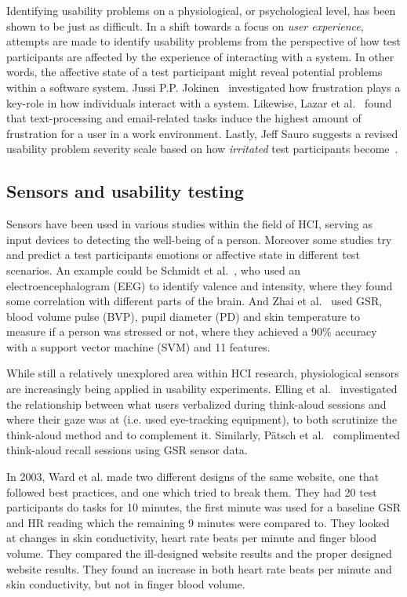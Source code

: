 Identifying usability problems on a physiological, or psychological level, has been shown to be just as difficult. In a
shift towards a focus on \textit{user experience}, attempts are made to identify usability problems
from the perspective of how test participants are affected by the experience of interacting with a system. In other
words, the affective state of a test participant might reveal potential problems within a software system. Jussi
P.P. Jokinen~\cite{workplace_up_study} investigated how frustration plays a key-role in how individuals interact with a
system. Likewise, Lazar et al.~\cite{frustration_with_computers} found that text-processing and email-related tasks
induce the highest amount of frustration for a user in a work environment. Lastly, Jeff Sauro suggests a revised usability problem severity scale based on how
\textit{irritated} test participants become~\cite{jeff_severity}.

\subsection{Sensors and usability testing}
Sensors have been used in various studies within the field of HCI, serving as input devices to detecting the well-being of a person.
Moreover some studies try and predict a test participants emotions or affective state in different test scenarios. 
An example could be Schmidt et al.~\cite{schmidt_trainor}, who used an electroencephalogram (EEG) to identify valence and intensity, where they found some correlation with different parts of the brain.
And Zhai et al.~\cite{gsr_data_processing2} used GSR, blood volume pulse (BVP), pupil diameter (PD) and skin temperature to measure if a person was stressed or not, where they achieved a 90\% accuracy with a support vector machine (SVM) and 11 features.

While still a relatively unexplored area within HCI research,
physiological sensors are increasingly being applied in usability experiments.
Elling et al.~\cite{concurrent_think_aloud_eye_tracking} investigated the
relationship between what users verbalized during think-aloud sessions and where
their gaze was at (i.e. used eye-tracking equipment), to both scrutinize the
think-aloud method and to complement it. Similarly, P\"{a}tsch et
al.~\cite{using_sensor_graphs_think_aloud} complimented think-aloud recall
sessions using GSR sensor data.

In 2003, Ward et al.\cite{shitty_web} made two different designs of the same website, one that followed best practices, and one which tried to break them. 
They had 20 test participants do tasks for 10 minutes, the first minute was used for a baseline GSR and HR reading which the remaining 9 minutes were compared to. They looked at changes in skin conductivity, heart rate beats per minute and finger blood volume.
They compared the ill-designed website results and the proper designed website results.
They found an increase in both heart rate beats per minute and skin conductivity, but not in finger blood volume.

